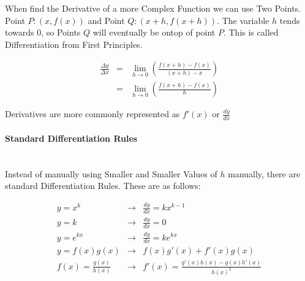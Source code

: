 \begin{flushleft}
                    When find the Derivative of a more Complex Function we can use Two Points. Point $P : (x, f(x))$ and Point $Q : (x + h, f(x + h))$.
                    The variable $h$ tends towards 0, so Points $Q$ will eventually be ontop of point $P$. This is called Differentiation from First
                    Principles.
                    \vspace{0.4cm}

                    \begin{eqnarray*}
                        \frac{\Delta y}{\Delta x} &=& \lim_{h\to0} \left(\frac{f(x + h) - f(x)}{(x + h) - x}\right) \\
                        &=& \lim_{h\to0} \left(\frac{f(x + h) - f(x)}{h}\right)
                    \end{eqnarray*}
                    \vspace{0.6cm}

                    Derivatives are more commonly represented as $f'(x)$ or $\frac{dy}{dx}$

                    \vspace{0.4cm}
                \paragraph{Standard Differentiation Rules}  \mbox{} \\
                    \vspace{0.2cm}
                    Instead of manually using Smaller and Smaller Values of $h$ manually, there are standard Differentiation Rules. These are as follows: \\
                    \vspace{0.4cm}

                    \begin{eqnarray*}
                        y = x^{k} &\rightarrow& \frac{dy}{dx} = kx^{k-1} \\
                        y = k &\rightarrow& \frac{dy}{dx} = 0 \\
                        y = e^{kx} &\rightarrow& \frac{dy}{dx} = ke^{kx} \\
                        y = f(x)g(x) &\rightarrow& f(x)g'(x) + f'(x)g(x) \\
                        f(x) = \frac{g(x)}{h(x)} &\rightarrow& f'(x) = \frac{g'(x)h(x) - g(x)h'(x)}{h(x)^{2}} \\
                    \end{eqnarray*}
                    \vspace{0.4cm}


\end{flushleft}
